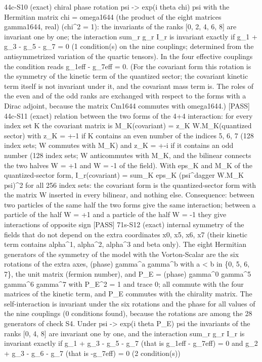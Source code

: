 \documentclass[
  10pt,
]{article}
\newenvironment{Shaded}{}{}
\newcommand{\NormalTok}[1]{#1}
\begin{document}
\begin{Shaded}
\begin{Highlighting}[]
\NormalTok{[PASS] 44c{-}S10  (exact) chiral phase rotation psi {-}\textgreater{} exp(i theta chi) psi with the Hermitian matrix chi = omega1644 (the product of the eight matrices gamma1644, real) (chi\^{}2 = 1): the invariants of the ranks [0, 2, 4, 6, 8] are invariant one by one; the interaction sum\_r g\_r I\_r is invariant exactly if g\_1 + g\_3 {-} g\_5 {-} g\_7 = 0 (1 condition(s) on the nine couplings; determined from the antisymmetrized variation of the quartic tensors). In the four effective couplings the condition reads g\_1eff {-} g\_7eff = 0. (For the covariant form this rotation is the symmetry of the kinetic term of the quantized sector; the covariant kinetic term itself is not invariant under it, and the covariant mass term is. The roles of the even and of the odd ranks are exchanged with respect to the forms with a Dirac adjoint, because the matrix Cm1644 commutes with omega1644.)}
\NormalTok{[PASS] 44c{-}S11  (exact) relation between the two forms of the 4+4 interaction: for every index set K the covariant matrix is M\_K(covariant) = z\_K W.M\_K(quantized sector) with z\_K = +{-}1 if K contains an even number of the indices 5, 6, 7 (128 index sets; W commutes with M\_K) and z\_K = +{-}i if it contains an odd number (128 index sets; W anticommutes with M\_K, and the bilinear connects the two halves W = +1 and W = {-}1 of the field). With eps\_K and M\_K of the quantized{-}sector form, I\_r(covariant) = sum\_K eps\_K (psi\^{}dagger W.M\_K psi)\^{}2 for all 256 index sets: the covariant form is the quantized{-}sector form with the matrix W inserted in every bilinear, and nothing else. Consequence: between two particles of the same half the two forms give the same interaction; between a particle of the half W = +1 and a particle of the half W = {-}1 they give interactions of opposite sign}
\NormalTok{[PASS] 71s{-}S12  (exact) internal symmetry of the fields that do not depend on the extra coordinates x0, x5, x6, x7 (their kinetic term contains alpha\^{}1, alpha\^{}2, alpha\^{}3 and beta only). The eight Hermitian generators of the symmetry of the model with the Vorton{-}Scalar are the six rotations of the extra axes, (phase) gamma\^{}a gamma\^{}b with a \textless{} b in \{0, 5, 6, 7\}, the unit matrix (fermion number), and P\_E = (phase) gamma\^{}0 gamma\^{}5 gamma\^{}6 gamma\^{}7 with P\_E\^{}2 = 1 and trace 0; all commute with the four matrices of the kinetic term, and P\_E commutes with the chirality matrix. The self{-}interaction is invariant under the six rotations and the phase for all values of the nine couplings (0 conditions found), because the rotations are among the 28 generators of check S4. Under psi {-}\textgreater{} exp(i theta P\_E) psi the invariants of the ranks [0, 4, 8] are invariant one by one, and the interaction sum\_r g\_r I\_r is invariant exactly if g\_1 + g\_3 {-} g\_5 {-} g\_7 (that is g\_1eff {-} g\_7eff) = 0 and g\_2 + g\_3 {-} g\_6 {-} g\_7 (that is {-}g\_7eff) = 0 (2 condition(s))}

\end{Highlighting}
\end{Shaded}
\end{document}
